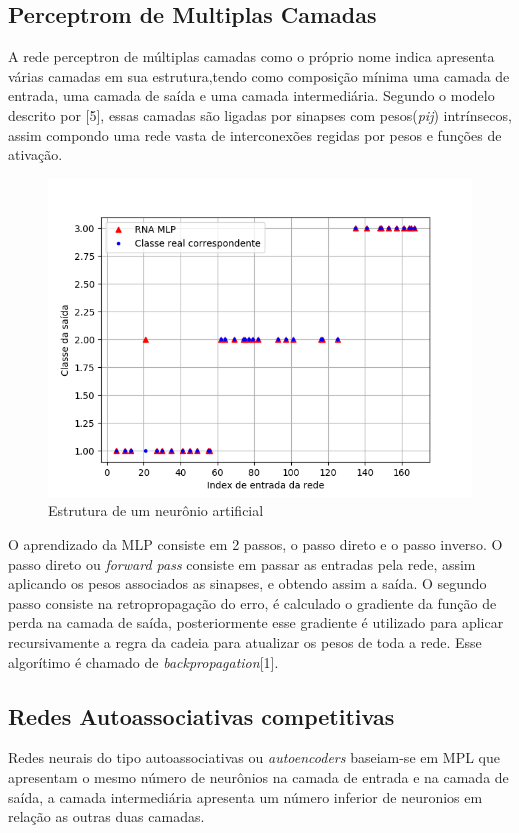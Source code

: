 \subsection{Perceptrom de Multiplas Camadas}
A rede perceptron de múltiplas camadas como o próprio nome indica apresenta várias camadas em sua estrutura,tendo como composição mínima uma camada de entrada, uma camada de saída e uma camada intermediária. Segundo o modelo descrito por [5], essas camadas são ligadas por sinapses com pesos(\textit{pij}) intrínsecos, assim compondo uma rede vasta de interconexões regidas por pesos e funções de ativação.
\begin{figure}[H]

\centering %
\includegraphics[width=\columnwidth]{04-Figuras/MLP}
\caption{Estrutura de um neurônio artificial}

\label{figura:Arquitetura de uma rede MLP}

\end{figure}

O aprendizado da MLP consiste em 2 passos, o passo direto e o passo inverso. O passo direto ou \textit{forward pass} consiste em passar as entradas pela rede, assim aplicando os pesos associados as sinapses, e obtendo assim a saída. O segundo passo consiste na retropropagação do erro, é calculado o gradiente da função de perda na camada de saída, posteriormente esse gradiente é utilizado para aplicar recursivamente a regra da cadeia para atualizar os pesos de toda a rede.
Esse algorítimo é chamado de \textit{backpropagation}[1].

\subsection{Redes Autoassociativas competitivas}
Redes neurais do tipo autoassociativas ou \textit{autoencoders} baseiam-se em MPL que apresentam o mesmo número de neurônios na camada de entrada e na camada de saída, a camada intermediária apresenta um número inferior de neuronios em relação as outras duas camadas. 

